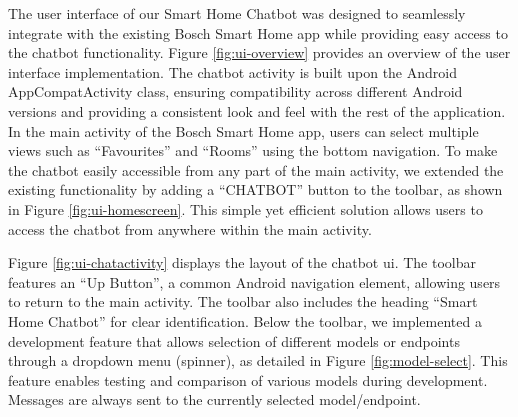 The user interface of our Smart Home Chatbot was designed to seamlessly integrate with the existing Bosch Smart Home app while providing easy access to the chatbot functionality. Figure \ref{fig:ui-overview} provides an overview of the user interface implementation.
The chatbot activity is built upon the Android AppCompatActivity class, ensuring compatibility across different Android versions and providing a consistent look and feel with the rest of the application.
In the main activity of the Bosch Smart Home app, users can select multiple views such as ``Favourites'' and ``Rooms'' using the bottom navigation. To make the chatbot easily accessible from any part of the main activity, we extended the existing functionality by adding a ``CHATBOT'' button to the toolbar, as shown in Figure \ref{fig:ui-homescreen}. This simple yet efficient solution allows users to access the chatbot from anywhere within the main activity.

Figure \ref{fig:ui-chatactivity} displays the layout of the chatbot \gls{ui}. The toolbar features an ``Up Button'', a common Android navigation element, allowing users to return to the main activity. The toolbar also includes the heading  ``Smart Home Chatbot'' for clear identification.
Below the toolbar, we implemented a development feature that allows selection of different models or endpoints through a dropdown menu (spinner), as detailed in Figure \ref{fig:model-select}. This feature enables testing and comparison of various models during development. Messages are always sent to the currently selected model/endpoint.

